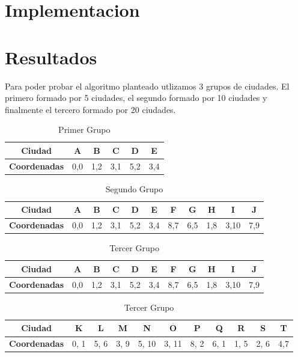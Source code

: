 \documentclass{article}
\begin{document}
\section{Implementacion}

\section{Resultados}
Para poder probar el algoritmo planteado utlizamos 3 grupos de ciudades. El primero formado por 5 ciudades, el segundo formado por 10 ciudades y finalmente el tercero formado por 20 ciudades.

\begin{table}[ht]
  \centering
  \caption{Primer Grupo}
  \begin{tabular}{|c|c|c|c|c|c|}
    \hline
    \textbf{Ciudad} & A & B & C & D& E \\
    \hline
    \textbf{Coordenadas} & 0,0 & 1,2 & 3,1 & 5,2 & 3,4\\
    \hline
  \end{tabular}
\end{table}

\begin{table}[ht]
  \centering
  \caption{Segundo Grupo}
  \begin{tabular}{|c|c|c|c|c|c|c|c|c|c|c|}
    \hline
    \textbf{Ciudad} & A & B & C & D & E & F & G & H & I & J \\
    \hline
    \textbf{Coordenadas} & 0,0 & 1,2 & 3,1 & 5,2 & 3,4 & 8,7 & 6,5 & 1,8 & 3,10 & 7,9\\
    \hline
  \end{tabular}
\end{table}

\begin{table}[ht]
  \centering
  \caption{Tercer Grupo}
  \begin{tabular}{|c|c|c|c|c|c|c|c|c|c|c|}
    \hline
    \textbf{Ciudad} & A & B & C & D & E & F & G & H & I & J \\
    \hline
    \textbf{Coordenadas} & 0,0 & 1,2 & 3,1 & 5,2 & 3,4 & 8,7 & 6,5 & 1,8 & 3,10 & 7,9\\
    \hline
  \end{tabular}
  \begin{tabular}{|c|c|c|c|c|c|c|c|c|c|c|}
    \hline
    \textbf{Ciudad} & K & L & M & N & O & P & Q & R & S & T \\
    \hline
    \textbf{Coordenadas} & 0, 1 & 5, 6 & 3, 9 & 5, 10 & 3, 11 & 8, 2 & 6, 1 & 1, 5 & 2, 6 & 4,7\\
    \hline
  \end{tabular}
\end{table}
\end{document}
